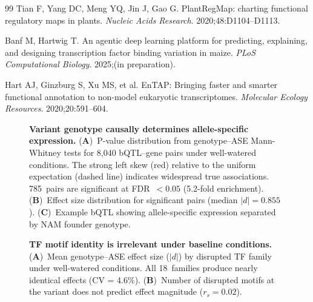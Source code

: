 \documentclass[10pt,letterpaper]{article}
\begin{document}
\begin{thebibliography}{99}
Tian F, Yang DC, Meng YQ, Jin J, Gao G.
PlantRegMap: charting functional regulatory maps in plants.
\textit{Nucleic Acids Research}. 2020;48:D1104--D1113.

Banf M, Hartwig T.
An agentic deep learning platform for predicting, explaining, and designing
transcription factor binding variation in maize.
\textit{PLoS Computational Biology}. 2025;(in preparation).

Hart AJ, Ginzburg S, Xu MS, et al.
EnTAP: Bringing faster and smarter functional annotation to non-model
eukaryotic transcriptomes.
\textit{Molecular Ecology Resources}. 2020;20:591--604.

\end{thebibliography}



\clearpage

\begin{figure}[h!]
\centering
\caption{\textbf{Variant genotype causally determines allele-specific expression.}
(\textbf{A})~P-value distribution from genotype--ASE Mann-Whitney tests for 8,040
bQTL--gene pairs under well-watered conditions. The strong left skew (red) relative
to the uniform expectation (dashed line) indicates widespread true associations.
785~pairs are significant at FDR~$< 0.05$ (5.2-fold enrichment).
(\textbf{B})~Effect size distribution for significant pairs (median $|d| = 0.855$).
(\textbf{C})~Example bQTL showing allele-specific expression separated by NAM
founder genotype.}
\label{fig:causal}
\end{figure}

\begin{figure}[h!]
\centering
\caption{\textbf{TF motif identity is irrelevant under baseline conditions.}
(\textbf{A})~Mean genotype--ASE effect size ($|d|$) by disrupted TF family under
well-watered conditions. All 18~families produce nearly identical effects
(CV = 4.6\%).
(\textbf{B})~Number of disrupted motifs at the variant does not predict effect
magnitude ($r_s = 0.02$).}
\label{fig:motif_irrelevance}
\end{figure}
\end{document}
